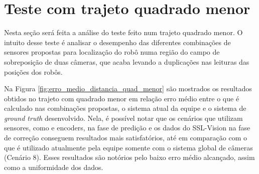 \documentclass[acronym, symbols, table, deposito]{fei}
\begin{document}
%			
		
	\section{Teste com trajeto quadrado menor} \label{sec:resultados_quadrado_menor}
	
	Nesta seção será feita a análise do teste feito num trajeto quadrado menor. O intuito desse teste é analisar o desempenho das diferentes combinações de sensores propostas para localização do robô numa região do campo de sobreposição de duas câmeras, que acaba levando a duplicações nas leituras das posições dos robôs.
	
	Na Figura \ref{fig:erro_medio_distancia_quad_menor} são mostrados os resultados obtidos no trajeto com quadrado menor em relação erro médio entre o que é calculado nas combinações propostas, o sistema atual da equipe e o sistema de \textit{ground truth} desenvolvido. Nela, é possível notar que os cenários que utilizam sensores, como  e encoders, na fase de predição e os dados do SSL-Vision na fase de correção conseguem resultados mais satisfatórios, até em comparação com o que é utilizado atualmente pela equipe somente com o sistema global de câmeras (Cenário 8). Esses resultados são notórios pelo baixo erro médio alcançado, assim como a uniformidade dos dados.
	
\end{document}
